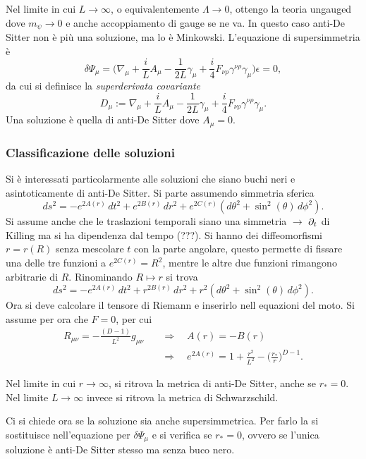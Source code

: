 Nel limite in cui $L \to \infty$, o equivalentemente $\Lambda \to 0$, ottengo la teoria ungauged dove $m_\psi \to 0$ e anche accoppiamento di gauge se ne va. In questo caso anti-De Sitter non è più una soluzione, ma lo è Minkowski. L'equazione di supersimmetria è 
\begin{equation}
    \delta\Psi_\mu = \bigg(\nabla_\mu + \frac{i}{L}A_\mu - \frac{1}{2L}\gamma_\mu + \frac{i}{4}F_{\nu\rho}\gamma^{\nu\rho}\gamma_\mu)\epsilon = 0,
\end{equation}
da cui si definisce la \emph{superderivata covariante} 
\begin{equation}
\label{eq: superderivata covariante}
    D_\mu := \nabla_\mu + \frac{i}{L}A_\mu - \frac{1}{2L}\gamma_\mu + \frac{i}{4}F_{\nu\rho}\gamma^{\nu\rho}\gamma_\mu.
\end{equation}
Una soluzione è quella di anti-De Sitter dove $A_\mu = 0$. 

\subsubsection{Classificazione delle soluzioni}
Si è interessati particolarmente alle soluzioni che siano buchi neri e asintoticamente di anti-De Sitter. Si parte assumendo simmetria sferica 
\begin{equation}
    ds^2 = -e^{2A(r)}\,dt^2 + e^{2B(r)}\,dr^2 + e^{2C(r)}(d\theta^2 + \sin^2{(\theta)}\,d\phi^2).
\end{equation}
Si assume anche che le traslazioni temporali siano una simmetria $\to$ $\partial_t$ di Killing ma si ha dipendenza dal tempo (???). Si hanno dei diffeomorfismi $r = r(R)$ senza mescolare $t$ con la parte angolare, questo permette di fissare una delle tre funzioni a $e^{2C(r)} = R^2$, mentre le altre due funzioni rimangono arbitrarie di $R$. Rinominando $R \mapsto r$ si trova 
\begin{equation}
    ds^2 = -e^{2A(r)}\,dt^2 + r^{2B(r)}\,dr^2 + r^2(d\theta^2 + \sin^2{(\theta)}\,d\phi^2).
\end{equation} 
Ora si deve calcolare il tensore di Riemann e inserirlo nell equazioni del moto. Si assume per ora che $F = 0$, per cui 
\begin{equation}
    \begin{split}
        R_{\mu\nu} = -\frac{(D - 1)}{L^2}g_{\mu\nu}&\quad\Rightarrow\quad A(r) = -B(r) \\
        &\quad\Rightarrow\quad e^{2A(r)} = 1 + \frac{r^2}{L^2} - \bigg(\frac{r_*}{r}\bigg)^{D - 1}.
    \end{split}
\end{equation}
\begin{obs}
    Nel limite in cui $r \to \infty$, si ritrova la metrica di anti-De Sitter, anche se $r_* = 0$. Nel limite $L \to \infty$ invece si ritrova la metrica di Schwarzschild.
\end{obs}
Ci si chiede ora se la soluzione sia anche supersimmetrica. Per farlo la si sostituisce nell'equazione per $\delta\Psi_\mu$ e si verifica se $r_* = 0$, ovvero se l'unica soluzione è anti-De Sitter stesso ma senza buco nero. 

